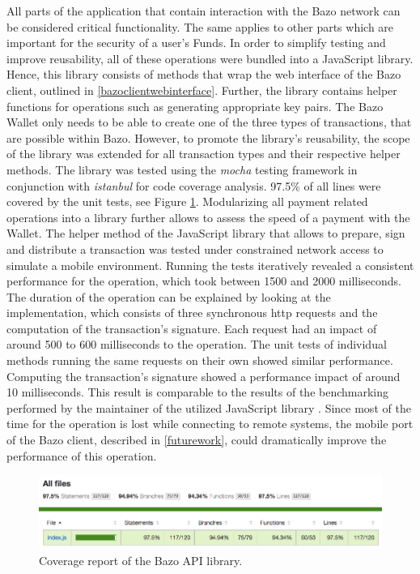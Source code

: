 All parts of the application that contain interaction with the Bazo network can be considered critical functionality. The same applies to other parts which are important for the security of a user's Funds. In order to simplify testing and improve reusability, all of these operations were bundled into a JavaScript library. Hence, this library consists of methods that wrap the web interface of the Bazo client, outlined in \ref{bazoclientwebinterface}. Further, the library contains helper functions for operations such as generating appropriate key pairs. The Bazo Wallet only needs to be able to create one of the three types of transactions, that are possible within Bazo. However, to promote the library's reusability, the scope of the library was extended for all transaction types and their respective helper methods.
The library was tested using the \textit{mocha} testing framework in conjunction with \textit{istanbul} for code coverage analysis. 97.5\% of all lines were covered by the unit tests, see Figure \ref{fig:coverage}. Modularizing all payment related operations into a library further allows to assess the speed of a payment with the Wallet. The helper method of the JavaScript library that allows to prepare, sign and distribute a transaction was tested under constrained network access to simulate a mobile environment. Running the tests iteratively revealed a consistent performance for the operation, which took between 1500 and 2000 milliseconds. The duration of the operation can be explained by looking at the implementation, which consists of three synchronous http requests and the computation of the transaction's signature. Each request had an impact of around 500 to 600 milliseconds to the operation. The unit tests of individual methods running the same requests on their own showed similar performance. Computing the transaction's signature showed a performance impact of around 10 milliseconds. This result is comparable to the results of the benchmarking performed by the maintainer of the utilized JavaScript library \cite{elliptic}. 
Since most of the time for the operation is lost while connecting to remote systems, the mobile port of the Bazo client, described in \ref{futurework}, could dramatically improve the performance of this operation.

\begin{figure}
\centering
\includegraphics[width=1\textwidth]{screenshots/bazo-api-testing.png}
\caption{\label{fig:coverage}Coverage report of the Bazo API library.}
\end{figure}
